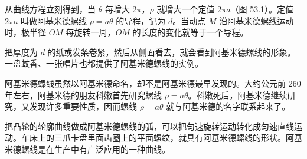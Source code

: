 从曲线方程立刻得到，当 $\theta$ 每增大 $2\pi$，$\rho$ 就增大一个定值 $2\pi a$（图 53.1）。定值 $2\pi a$ 叫做阿基米德螺线 $\rho = a\theta$ 的导程，记为 $d$。当动点 $M$ 沿阿基米德螺线运动时，极半径 $OM$ 每旋转一周，$OM$ 的长度的变化就等于一个导程。

把厚度为 $d$ 的纸或发条卷紧，然后从侧面看去，就会看到阿基米德螺线的形象。一盘蚊香、一张唱片也都提供了阿基米德螺线的实例。

阿基米德螺线虽然以阿基米德命名，却不是阿基米德最早发现的。大约公元前 260 年左右，阿基米德的朋友科嫩首先研究螺线 $\rho = a\theta$。科嫩死后，阿基米德继续研究，又发现许多重要性质，因而螺线 $\rho = a\theta$ 就与阿基米德的名字联系起来了。

把凸轮的轮廓曲线做成阿基米德螺线的弧，可以把匀速旋转运动转化成匀速直线运动。车床上的三爪卡盘里面齿圈上的平面螺纹，就具有阿基米德螺线的形状。阿基米德螺线是在生产中有广泛应用的一种曲线。
